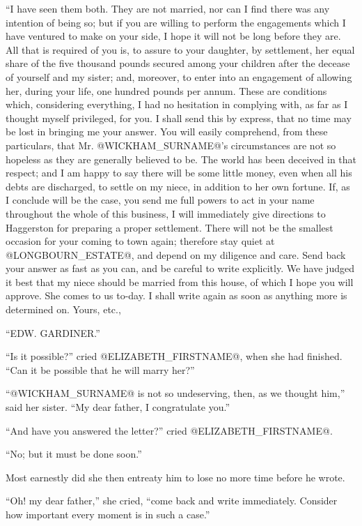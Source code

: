 ``I have seen them both. They are not married, nor can I find there
was any intention of being so; but if you are willing to perform the
engagements which I have ventured to make on your side, I hope it will
not be long before they are. All that is required of you is, to assure
to your daughter, by settlement, her equal share of the five thousand
pounds secured among your children after the decease of yourself and
my sister; and, moreover, to enter into an engagement of allowing her,
during your life, one hundred pounds per annum. These are conditions
which, considering everything, I had no hesitation in complying with,
as far as I thought myself privileged, for you. I shall send this by
express, that no time may be lost in bringing me your answer. You
will easily comprehend, from these particulars, that Mr. @WICKHAM_SURNAME@'s
circumstances are not so hopeless as they are generally believed to be.
The world has been deceived in that respect; and I am happy to say there
will be some little money, even when all his debts are discharged, to
settle on my niece, in addition to her own fortune. If, as I conclude
will be the case, you send me full powers to act in your name throughout
the whole of this business, I will immediately give directions to
Haggerston for preparing a proper settlement. There will not be the
smallest occasion for your coming to town again; therefore stay quiet at
@LONGBOURN_ESTATE@, and depend on my diligence and care. Send back your answer as
fast as you can, and be careful to write explicitly. We have judged it
best that my niece should be married from this house, of which I hope
you will approve. She comes to us to-day. I shall write again as soon as
anything more is determined on. Yours, etc.,

``EDW. GARDINER.''

``Is it possible?'' cried @ELIZABETH_FIRSTNAME@, when she had finished. ``Can it be
possible that he will marry her?''

``@WICKHAM_SURNAME@ is not so undeserving, then, as we thought him,'' said her
sister. ``My dear father, I congratulate you.''

``And have you answered the letter?'' cried @ELIZABETH_FIRSTNAME@.

``No; but it must be done soon.''

Most earnestly did she then entreaty him to lose no more time before he
wrote.

``Oh! my dear father,'' she cried, ``come back and write immediately.
Consider how important every moment is in such a case.''


